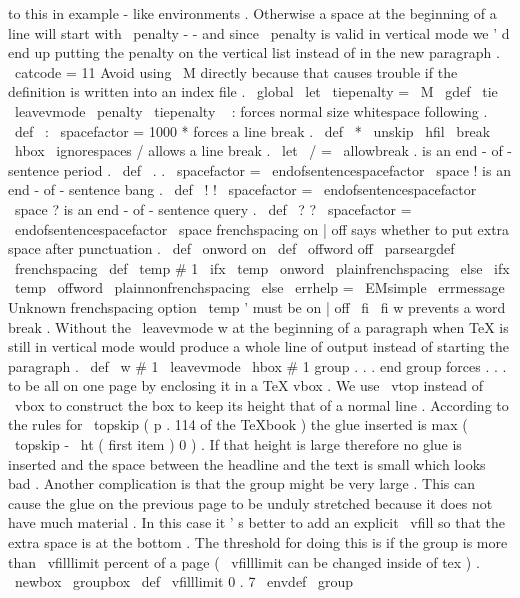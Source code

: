 {to
this
in
example
-
like
environments
.
Otherwise
a
space
%
at
the
beginning
of
a
line
will
start
with
\
penalty
-
-
and
%
since
\
penalty
is
valid
in
vertical
mode
we
'
d
end
up
putting
the
%
penalty
on
the
vertical
list
instead
of
in
the
new
paragraph
.
{
\
catcode
=
11
%
Avoid
using
\
M
directly
because
that
causes
trouble
%
if
the
definition
is
written
into
an
index
file
.
\
global
\
let
\
tiepenalty
=
\
M
\
gdef
\
tie
{
\
leavevmode
\
penalty
\
tiepenalty
\
}
}
%
:
forces
normal
size
whitespace
following
.
\
def
\
:
{
\
spacefactor
=
1000
}
%
*
forces
a
line
break
.
\
def
\
*
{
\
unskip
\
hfil
\
break
\
hbox
{
}
\
ignorespaces
}
%
/
allows
a
line
break
.
\
let
\
/
=
\
allowbreak
%
.
is
an
end
-
of
-
sentence
period
.
\
def
\
.
{
.
\
spacefactor
=
\
endofsentencespacefactor
\
space
}
%
!
is
an
end
-
of
-
sentence
bang
.
\
def
\
!
{
!
\
spacefactor
=
\
endofsentencespacefactor
\
space
}
%
?
is
an
end
-
of
-
sentence
query
.
\
def
\
?
{
?
\
spacefactor
=
\
endofsentencespacefactor
\
space
}
%
frenchspacing
on
|
off
says
whether
to
put
extra
space
after
punctuation
.
%
\
def
\
onword
{
on
}
\
def
\
offword
{
off
}
%
\
parseargdef
\
frenchspacing
{
%
\
def
\
temp
{
#
1
}
%
\
ifx
\
temp
\
onword
\
plainfrenchspacing
\
else
\
ifx
\
temp
\
offword
\
plainnonfrenchspacing
\
else
\
errhelp
=
\
EMsimple
\
errmessage
{
Unknown
frenchspacing
option
\
temp
'
must
be
on
|
off
}
%
\
fi
\
fi
}
%
w
prevents
a
word
break
.
Without
the
\
leavevmode
w
at
the
%
beginning
of
a
paragraph
when
TeX
is
still
in
vertical
mode
would
%
produce
a
whole
line
of
output
instead
of
starting
the
paragraph
.
\
def
\
w
#
1
{
\
leavevmode
\
hbox
{
#
1
}
}
%
group
.
.
.
end
group
forces
.
.
.
to
be
all
on
one
page
by
enclosing
%
it
in
a
TeX
vbox
.
We
use
\
vtop
instead
of
\
vbox
to
construct
the
box
%
to
keep
its
height
that
of
a
normal
line
.
According
to
the
rules
for
%
\
topskip
(
p
.
114
of
the
TeXbook
)
the
glue
inserted
is
%
max
(
\
topskip
-
\
ht
(
first
item
)
0
)
.
If
that
height
is
large
%
therefore
no
glue
is
inserted
and
the
space
between
the
headline
and
%
the
text
is
small
which
looks
bad
.
%
%
Another
complication
is
that
the
group
might
be
very
large
.
This
can
%
cause
the
glue
on
the
previous
page
to
be
unduly
stretched
because
it
%
does
not
have
much
material
.
In
this
case
it
'
s
better
to
add
an
%
explicit
\
vfill
so
that
the
extra
space
is
at
the
bottom
.
The
%
threshold
for
doing
this
is
if
the
group
is
more
than
\
vfilllimit
%
percent
of
a
page
(
\
vfilllimit
can
be
changed
inside
of
tex
)
.
%
\
newbox
\
groupbox
\
def
\
vfilllimit
{
0
.
7
}
%
\
envdef
\
group
{
%
}}

